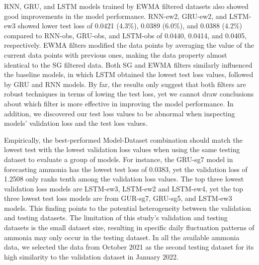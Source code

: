 RNN, GRU, and LSTM models trained by EWMA filtered datasets also showed good improvements in the model performance. RNN-ew2, GRU-ew2, and LSTM-ew3 showed lower test loss of 0.0421 (4.3\%), 0.0389 (6.0\%), and 0.0388 (4.2\%) compared to RNN-obs, GRU-obs, and LSTM-obs of 0.0440, 0.0414, and 0.0405, respectively. EWMA filters modified the data points by averaging the value of the current data points with previous ones, making the data property almost identical to the SG filtered data. Both SG and EWMA filters similarly influenced the baseline models, in which LSTM obtained the lowest test loss values, followed by GRU and RNN models. By far, the results only suggest that both filters are robust techniques in terms of lowing the test loss, yet we cannot draw conclusions about which filter is more effective in improving the model performance. In addition, we discovered our test loss values to be abnormal when inspecting models' validation loss and the test loss values.


Empirically, the best-performed Model-Dataset combination should match the lowest test with the lowest validation loss values when using the same testing dataset to evaluate a group of models. For instance, the GRU-sg7 model in forecasting ammonia has the lowest test loss of 0.0383, yet the validation loss of 1.2508 only ranks tenth among the validation loss values. The top three lowest validation loss models are LSTM-ew3, LSTM-ew2 and LSTM-ew4, yet the top three lowest test loss models are from GUR-sg7, GRU-sg5, and LSTM-ew3 models. This finding points to the potential heterogeneity between the validation and testing datasets. The limitation of this study's validation and testing datasets is the small dataset size, resulting in specific daily fluctuation patterns of ammonia may only occur in the testing dataset. In all the available ammonia data, we selected the data from October 2021 as the second testing dataset for its high similarity to the validation dataset in January 2022.

